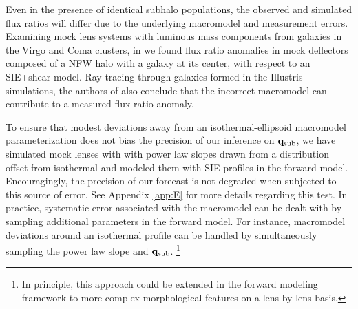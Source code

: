 Even in the presence of identical subhalo populations, the observed and simulated flux ratios will differ due to the underlying macromodel and measurement errors. Examining mock lens systems with luminous mass components from galaxies in the Virgo and Coma clusters, in \cite{Gilman++17} we found flux ratio anomalies in mock deflectors composed of a NFW halo with a galaxy at its center, with respect to an SIE+shear model. Ray tracing through galaxies formed in the Illustris simulations, the authors of \cite{Hsueh2++17} also conclude that the incorrect macromodel can contribute to a measured flux ratio anomaly. 

To ensure that modest deviations away from an isothermal-ellipsoid macromodel parameterization does not bias the precision of our inference on ${\bf{q}_{\rm{sub}}}$, we have simulated mock lenses with with power law slopes drawn from a distribution offset from isothermal and modeled them with SIE profiles in the forward model. Encouragingly, the precision of our forecast is not degraded when subjected to this source of error. See Appendix \ref{app:E} for more details regarding this test. In practice, systematic error associated with the macromodel can be dealt with by sampling additional parameters in the forward model. For instance, macromodel deviations around an isothermal profile can be handled by simultaneously sampling the power law slope and ${\bf{q}_{\rm{sub}}}$. \footnote{In principle, this approach could be extended in the forward modeling framework to more complex morphological features on a lens by lens basis.}

